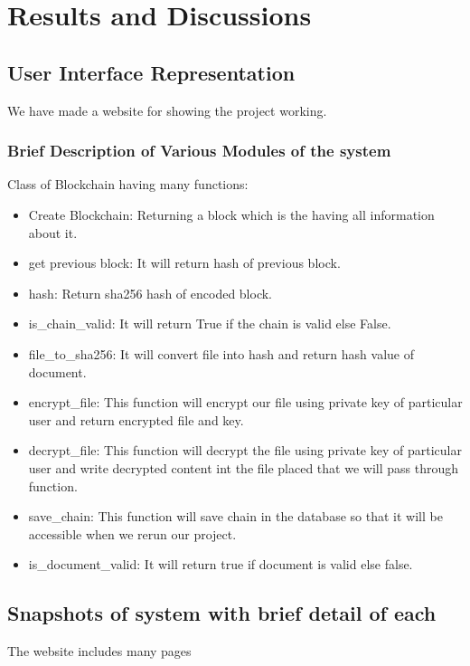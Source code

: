 
\clearpage
\section{Results and Discussions}

\subsection{User Interface Representation}
We have made a website for showing the project working.
\subsubsection{Brief Description of Various Modules of the system}
Class of Blockchain having many functions:
\begin{itemize}
    \item Create Blockchain: Returning a block which is the having all information about it.
    \item get previous block: It will return hash of previous block.
    \item hash: Return sha256 hash of encoded block.
    \item is\_chain\_valid: It will return True if the chain is valid else False.
    \item file\_to\_sha256: It will convert file into hash and return hash value of document.
    \item encrypt\_file: This function will encrypt our file using private key of particular user and return encrypted file and key.
    \item decrypt\_file: This function will decrypt the file using private key of particular user and write decrypted content int the file placed that we will pass through function.
    \item save\_chain: This function will save chain in the database so that it will be accessible when we rerun our project.
    \item is\_document\_valid: It will return true if document is valid else false.
\end{itemize}

\subsection{Snapshots of system with brief detail of each}
The website includes many pages 

